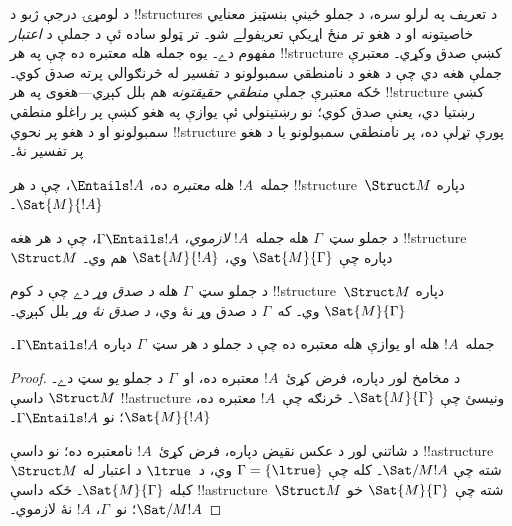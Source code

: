 \documentclass[../../../include/open-logic-section]{subfiles}
\begin{document}

\begin{explain}
د لومړۍ درجې ژبو د !!{structure}s د تعريف په لرلو سره، د جملو ځينې
بنسټيز معنايي خاصيتونه او د هغو تر منځ اړيکې تعريفولے شو۔ تر ټولو
ساده ئې د جملې د \emph{اعتبار} مفهوم دے۔ يوه جمله هله معتبره ده چې
په هر !!{structure} کښې صدق وکړي۔ معتبرې جملې هغه دي چې د هغو د
نامنطقي سمبولونو د تفسير له څرنګوالي پرته صدق کوي۔ ځکه معتبرې جملې
\emph{منطقي حقيقتونه} هم بلل کېږي---هغوی په هر !!{structure} کښې
رښتيا دي، يعنې صدق کوي؛ نو رښتينولي ئې يوازې په هغو کښې پر راغلو
منطقي سمبولونو او د هغو پر نحوي !!{structure} پورې تړلې ده، پر
نامنطقي سمبولونو يا د هغو پر تفسير نۀ۔
\end{explain}

\begin{defn}[اعتبار]
جمله~$!A$ هله \emph{معتبره} ده، $\Entails !A$، چې د هر
!!{structure}~$\Struct M$ دپاره $\Sat{M}{!A}$۔
\end{defn}

\begin{defn}[استلزام]
د جملو سټ~$\Gamma$ هله جمله~$!A$ \emph{لازموي}،
$\Gamma \Entails !A$، چې د هر هغه !!{structure}~$\Struct M$ دپاره
چې $\Sat{M}{\Gamma}$ وي، $\Sat{M}{!A}$ هم وي۔
\end{defn}


\begin{defn}
د جملو سټ~$\Gamma$ هله \emph{د صدق وړ} دے چې د کوم
!!{structure}~$\Struct M$ دپاره $\Sat{M}{\Gamma}$ وي۔ که~$\Gamma$ د
صدق وړ نۀ وي، \emph{د صدق نۀ وړ} بلل کېږي۔
\end{defn}

\begin{prop}
جمله~$!A$ هله او يوازې هله معتبره ده چې د جملو د هر سټ~$\Gamma$
دپاره $\Gamma \Entails !A$۔
\end{prop}

\begin{proof}
د مخامخ لور دپاره، فرض کړئ~$!A$ معتبره ده، او~$\Gamma$ د جملو يو
سټ دے۔ $\Struct M$ داسې !!a{structure} ونيسئ چې
$\Sat{M}{\Gamma}$۔ څرنګه چې~$!A$ معتبره ده، $\Sat{M}{!A}$؛ نو
$\Gamma \Entails !A$۔

د شاتني لور د عکس نقيض دپاره، فرض کړئ~$!A$ نامعتبره ده؛ نو داسې
!!a{structure}~$\Struct M$ شته چې $\Sat/{M}{!A}$۔ کله چې
$\Gamma = \{ \ltrue \}$ وي، د~$\ltrue$ د اعتبار له کبله
$\Sat{M}{\Gamma}$۔ ځکه داسې !!a{structure}~$\Struct M$ شته چې
$\Sat{M}{\Gamma}$ خو $\Sat/{M}{!A}$؛ نو~$\Gamma$، $!A$ نۀ لازموي۔
\end{proof}
\end{document}
